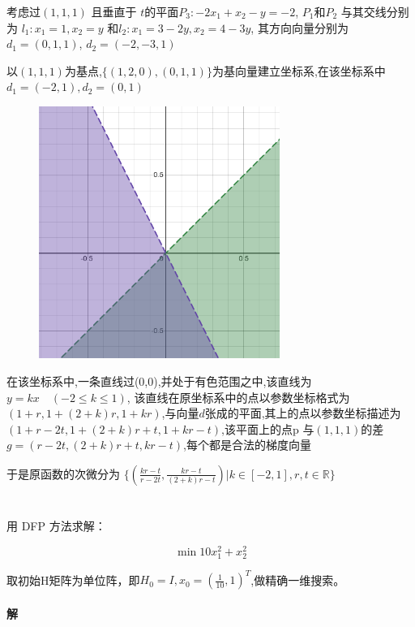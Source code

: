 \documentclass[a4paper]{article}
\begin{document}
考虑过$(1,1,1)$ 且垂直于 $t$的平面$P_3: -2x_1 +x_2 - y = -2$, $P_1$和$P_2$ 与其交线分别为 
$l_1 : x_1 = 1,x_2 = y$ 和$l_2 : x_1 = 3-2y,x_2 = 4-3y$,   其方向向量分别为 $d_1 = (0,1,1)$, $d_2 = (-2,-3,1)$

以$(1,1,1)$为基点,$\{(1,2,0),(0,1,1)\}$为基向量建立坐标系,在该坐标系中$d_1 = (-2,1),d_2 = (0,1)$

\begin{figure}[H]
    \centering
    \includegraphics[width=0.7\textwidth]{pic/p5s3.png}
\end{figure}

在该坐标系中,一条直线过(0,0),并处于有色范围之中,该直线为 $y = kx \quad (-2 \leq k \leq 1)$, 该直线在原坐标系中的点以参数坐标格式为$(1+r,1+(2+k)r,1+kr)$,与向量$d$张成的平面,其上的点以参数坐标描述为 $(1+r - 2t,1+ (2+k)r +t, 1+kr-t)$,该平面上的点p 与$(1,1,1)$的差 $g = (r - 2t,(2+k)r + t , kr-t)$,每个都是合法的梯度向量

于是原函数的次微分为 \(\{(\frac{kr-t}{r-2t},\frac{kr-t}{(2+k)r-t}) | k \in [-2,1], r,t \in \mathbb{R}\}\)


\section{}

用 DFP 方法求解：

\[\min 10x_1^2 + x_2^2\]

取初始H矩阵为单位阵，即$H_0 = I, x_0 = (\frac{1}{10},1)^T$,做精确一维搜索。

\paragraph{解}
\end{document}
